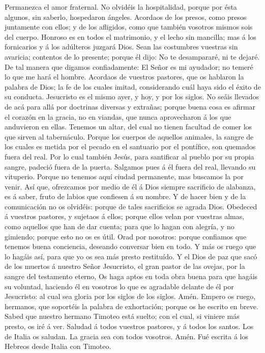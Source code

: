 Permanezca el amor fraternal.  No olvidéis
la hospitalidad, porque por ésta algunos, sin saberlo, hospedaron
ángeles.  Acordaos de los presos, como presos juntamente
con ellos; y de los afligidos, como que también vosotros mismos sois del
cuerpo.  Honroso es en todos el matrimonio, y el lecho sin
mancilla; mas á los fornicarios y á los adúlteros juzgará Dios.
 Sean las costumbres vuestras sin avaricia; contentos de
lo presente; porque él dijo: No te desampararé, ni te dejaré.
 De tal manera que digamos confiadamente: El Señor es mi
ayudador; no temeré lo que me hará el hombre.  Acordaos de
vuestros pastores, que os hablaron la palabra de Dios; la fe de los
cuales imitad, considerando cuál haya sido el éxito de su conducta.
 Jesucristo es el mismo ayer, y hoy, y por los siglos.
 No seáis llevados de acá para allá por doctrinas diversas
y extrañas; porque buena cosa es afirmar el corazón en la gracia, no en
viandas, que nunca aprovecharon á los que anduvieron en ellas.
 Tenemos un altar, del cual no tienen facultad de comer
los que sirven al tabernáculo.  Porque los cuerpos de
aquellos animales, la sangre de los cuales es metida por el pecado en el
santuario por el pontífice, son quemados fuera del real. 
Por lo cual también Jesús, para santificar al pueblo por su propia
sangre, padeció fuera de la puerta.  Salgamos pues á él
fuera del real, llevando su vituperio.  Porque no tenemos
aquí ciudad permanente, mas buscamos la por venir.  Así
que, ofrezcamos por medio de él á Dios siempre sacrificio de alabanza,
es á saber, fruto de labios que confiesen á su nombre.  Y
de hacer bien y de la comunicación no os olvidéis: porque de tales
sacrificios se agrada Dios.  Obedeced á vuestros
pastores, y sujetaos á ellos; porque ellos velan por vuestras almas,
como aquellos que han de dar cuenta; para que lo hagan con alegría, y no
gimiendo; porque esto no os es útil.  Orad por nosotros:
porque confiamos que tenemos buena conciencia, deseando conversar bien
en todo.  Y más os ruego que lo hagáis así, para que yo
os sea más presto restituído.  Y el Dios de paz que sacó
de los muertos á nuestro Señor Jesucristo, el gran pastor de las ovejas,
por la sangre del testamento eterno,  Os haga aptos en
toda obra buena para que hagáis su voluntad, haciendo él en vosotros lo
que es agradable delante de él por Jesucristo: al cual sea gloria por
los siglos de los siglos. Amén.  Empero os ruego,
hermanos, que soportéis la palabra de exhortación; porque os he escrito
en breve.  Sabed que nuestro hermano Timoteo está suelto;
con el cual, si viniere más presto, os iré á ver. 
Saludad á todos vuestros pastores, y á todos los santos. Los de Italia
os saludan.  La gracia sea con todos vosotros. Amén. Fué
escrita á los Hebreos desde Italia con Timoteo.
